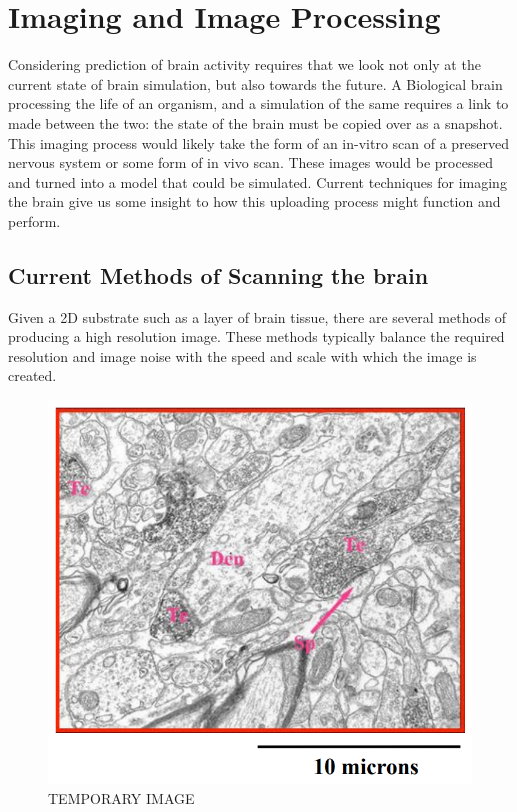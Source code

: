 \section{Imaging and Image Processing}

Considering prediction of brain activity requires that we look not only at the
current state of brain simulation, but also towards the future. A Biological
brain processing the life of an organism, and a simulation of the same requires
a link to made between the two: the state of the brain must be copied over as a
snapshot. This imaging process would likely take the form of an in-vitro scan of
a preserved nervous system or some form of in vivo scan. These images would be
processed and turned into a model that could be simulated. Current techniques for imaging the brain give us some insight to how this
uploading process might function and perform.

\subsection{Current Methods of Scanning the brain}

Given a 2D substrate such as a layer of brain
tissue, there are several methods of producing a high resolution image. These
methods typically balance the required resolution and image noise with the speed
and scale with which the image is created.

\begin{figure}[h]
    \centering
    \includegraphics{figures/graphs/scaleexample.png}
    {TEMPORARY IMAGE}
    \label{scaleexample}
\end{figure}
\vspace{1ex}


